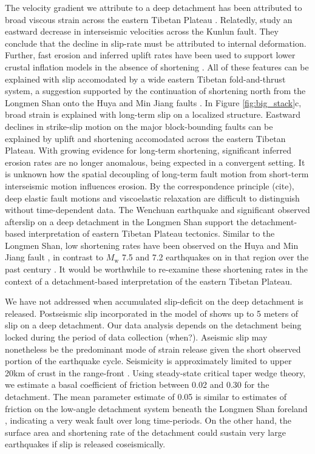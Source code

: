 \documentclass[12pt]{article}
\begin{document}
The velocity gradient we attribute to a deep detachment has been attributed to broad viscous strain across the eastern Tibetan Plateau \citep{Royden2008}. Relatedly, \citet{kirby07} study an eastward decrease in interseismic velocities across the Kunlun fault. They conclude that the decline in slip-rate must be attributed to internal deformation. Further, fast erosion and inferred uplift rates have been used to support lower crustal inflation models in the absence of shortening \citep{Kirby2003}. All of these features can be explained with slip accomodated by a wide eastern Tibetan fold-and-thrust system, a suggestion supported by the continuation of shortening north from the Longmen Shan onto the Huya \citep{kirby00} and Min Jiang faults \citep{Chen1994}. In Figure \ref{fig:big_stack}c, broad strain is explained with long-term slip on a localized structure. Eastward declines in strike-slip motion on the major block-bounding faults can be explained by uplift and shortening accomodated across the eastern Tibetan Plateau. With growing evidence for long-term shortening, significant inferred erosion rates are no longer anomalous, being expected in a convergent setting. It is unknown how the spatial decoupling of long-term fault motion from short-term interseismic motion influences erosion.  
By the correspondence principle (cite), deep elastic fault motions and viscoelastic relaxation are difficult to distinguish without time-dependent data. The Wenchuan earthquake and significant observed afterslip on a deep detachment \citep{Qi2011, Huang2014} in the Longmen Shan support the detachment-based interpretation of eastern Tibetan Plateau tectonics. Similar to the Longmen Shan, low shortening rates have been observed on the Huya and Min Jiang fault \citep{Kirby2000}, in contrast to $M_{\textrm{w}}$ 7.5 and 7.2 earthquakes on in that region over the past century \citep{Chen1994}. It would be worthwhile to re-examine these shortening rates in the context of a detachment-based interpretation of the eastern Tibetan Plateau. 

We have not addressed when accumulated slip-deficit on the deep detachment is released. Postseismic slip incorporated in the model of \cite{Qi2011} shows up to 5 meters of slip on a deep detachment. Our data analysis depends on the detachment being locked during the period of data collection (when?). Aseismic slip may nonetheless be the predominant mode of strain release given the short observed portion of the earthquake cycle. Seismicity is approximately limited to upper 20km of crust in the range-front \citep{Li2010}. Using steady-state critical taper wedge theory, we estimate a basal coefficient of friction between 0.02 and 0.30 for the detachment. The mean parameter estimate of 0.05 is similar to estimates of friction on the low-angle detachment system beneath the Longmen Shan foreland \citep{Hubbard2010}, indicating a very weak fault over long time-periods. On the other hand, the surface area and shortening rate of the detachment could sustain very large earthquakes if slip is released coseismically.
\end{document}
